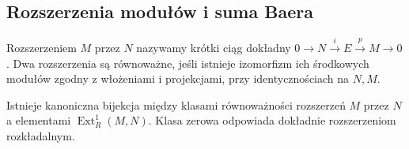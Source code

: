 \subsection{Rozszerzenia modułów i suma Baera}
\begin{definicja}\label{cat:def:module-extension}
Rozszerzeniem $M$ przez $N$ nazywamy krótki ciąg dokładny $0\to N\xrightarrow{i}E\xrightarrow{p}M\to0$. Dwa rozszerzenia są równoważne, jeśli istnieje izomorfizm ich środkowych modułów zgodny z włożeniami i projekcjami, przy identycznościach na $N,M$.
\end{definicja}
\begin{twierdzenie}\label{cat:thm:ext-extensions}
Istnieje kanoniczna bijekcja między klasami równoważności rozszerzeń $M$ przez $N$ a elementami $\operatorname{Ext}_R^1(M,N)$. Klasa zerowa odpowiada dokładnie rozszerzeniom rozkładalnym.
\end{twierdzenie}
